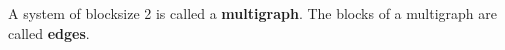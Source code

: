 A system of blocksize 2 is called a \textbf{multigraph}. The blocks of a multigraph are called \textbf{edges}.
